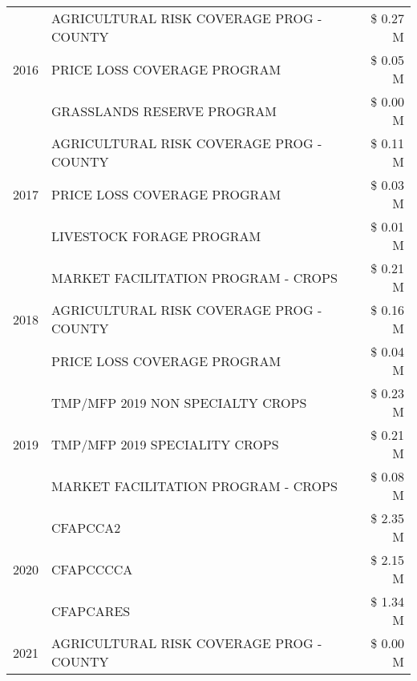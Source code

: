 \begin{tabular}{llr}
\multirow[t]{3}{*}{2016} & AGRICULTURAL RISK COVERAGE PROG - COUNTY & \$ 0.27 M \\
 & PRICE LOSS COVERAGE PROGRAM & \$ 0.05 M \\
 & GRASSLANDS RESERVE PROGRAM & \$ 0.00 M \\
\cline{1-3}
\multirow[t]{3}{*}{2017} & AGRICULTURAL RISK COVERAGE PROG - COUNTY & \$ 0.11 M \\
 & PRICE LOSS COVERAGE PROGRAM & \$ 0.03 M \\
 & LIVESTOCK FORAGE PROGRAM & \$ 0.01 M \\
\cline{1-3}
\multirow[t]{3}{*}{2018} & MARKET FACILITATION PROGRAM - CROPS & \$ 0.21 M \\
 & AGRICULTURAL RISK COVERAGE PROG - COUNTY & \$ 0.16 M \\
 & PRICE LOSS COVERAGE PROGRAM & \$ 0.04 M \\
\cline{1-3}
\multirow[t]{3}{*}{2019} & TMP/MFP 2019 NON SPECIALTY CROPS & \$ 0.23 M \\
 & TMP/MFP 2019 SPECIALITY CROPS & \$ 0.21 M \\
 & MARKET FACILITATION PROGRAM - CROPS & \$ 0.08 M \\
\cline{1-3}
\multirow[t]{3}{*}{2020} & CFAPCCA2 & \$ 2.35 M \\
 & CFAPCCCCA & \$ 2.15 M \\
 & CFAPCARES & \$ 1.34 M \\
\cline{1-3}
2021 & AGRICULTURAL RISK COVERAGE PROG - COUNTY & \$ 0.00 M \\
\cline{1-3}
\bottomrule
\end{tabular}
